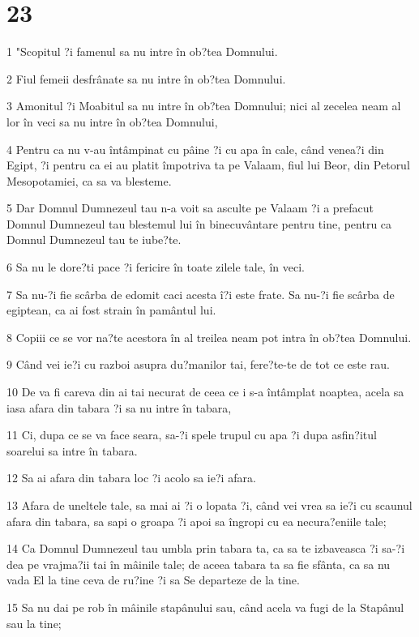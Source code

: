 \chapter{23}

\par 1 "Scopitul ?i famenul sa nu intre în ob?tea Domnului.
\par 2 Fiul femeii desfrânate sa nu intre în ob?tea Domnului.
\par 3 Amonitul ?i Moabitul sa nu intre în ob?tea Domnului; nici al zecelea neam al lor în veci sa nu intre în ob?tea Domnului,
\par 4 Pentru ca nu v-au întâmpinat cu pâine ?i cu apa în cale, când venea?i din Egipt, ?i pentru ca ei au platit împotriva ta pe Valaam, fiul lui Beor, din Petorul Mesopotamiei, ca sa va blesteme.
\par 5 Dar Domnul Dumnezeul tau n-a voit sa asculte pe Valaam ?i a prefacut Domnul Dumnezeul tau blestemul lui în binecuvântare pentru tine, pentru ca Domnul Dumnezeul tau te iube?te.
\par 6 Sa nu le dore?ti pace ?i fericire în toate zilele tale, în veci.
\par 7 Sa nu-?i fie scârba de edomit caci acesta î?i este frate. Sa nu-?i fie scârba de egiptean, ca ai fost strain în pamântul lui.
\par 8 Copiii ce se vor na?te acestora în al treilea neam pot intra în ob?tea Domnului.
\par 9 Când vei ie?i cu razboi asupra du?manilor tai, fere?te-te de tot ce este rau.
\par 10 De va fi careva din ai tai necurat de ceea ce i s-a întâmplat noaptea, acela sa iasa afara din tabara ?i sa nu intre în tabara,
\par 11 Ci, dupa ce se va face seara, sa-?i spele trupul cu apa ?i dupa asfin?itul soarelui sa intre în tabara.
\par 12 Sa ai afara din tabara loc ?i acolo sa ie?i afara.
\par 13 Afara de uneltele tale, sa mai ai ?i o lopata ?i, când vei vrea sa ie?i cu scaunul afara din tabara, sa sapi o groapa ?i apoi sa îngropi cu ea necura?eniile tale;
\par 14 Ca Domnul Dumnezeul tau umbla prin tabara ta, ca sa te izbaveasca ?i sa-?i dea pe vrajma?ii tai în mâinile tale; de aceea tabara ta sa fie sfânta, ca sa nu vada El la tine ceva de ru?ine ?i sa Se departeze de la tine.
\par 15 Sa nu dai pe rob în mâinile stapânului sau, când acela va fugi de la Stapânul sau la tine;
